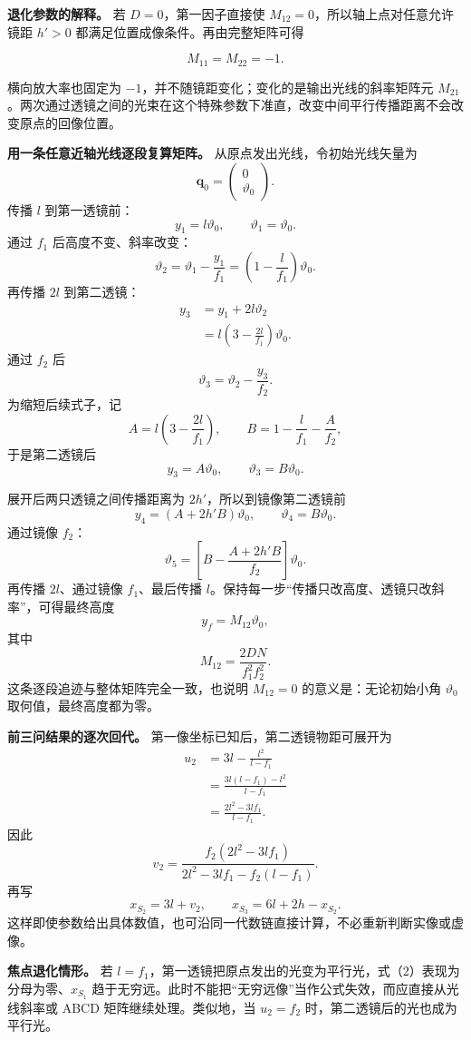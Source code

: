 \documentclass[12pt,a4paper,UTF8]{ctexart}
\begin{document}
\textbf{退化参数的解释。} 若 \(D=0\)，第一因子直接使
\(M_{12}=0\)，所以轴上点对任意允许镜距 \(h'>0\)
都满足位置成像条件。再由完整矩阵可得

\[M_{11}=M_{22}=-1.\]

横向放大率也固定为 \(-1\)，并不随镜距变化；变化的是输出光线的斜率矩阵元
\(M_{21}\)。两次通过透镜之间的光束在这个特殊参数下准直，改变中间平行传播距离不会改变原点的回像位置。

\textbf{用一条任意近轴光线逐段复算矩阵。}
从原点发出光线，令初始光线矢量为 \[
\boldsymbol q_0=
\begin{pmatrix}0\\ \vartheta_0\end{pmatrix}.
\] 传播 \(l\) 到第一透镜前： \[
y_1=l\vartheta_0,
\qquad
\vartheta_1=\vartheta_0.
\] 通过 \(f_1\) 后高度不变、斜率改变： \[
\vartheta_2
=\vartheta_1-\frac{y_1}{f_1}
=\left(1-\frac l{f_1}\right)\vartheta_0.
\] 再传播 \(2l\) 到第二透镜： \[
\begin{aligned}
y_3
&=y_1+2l\vartheta_2\\
&=l\left(3-\frac{2l}{f_1}\right)\vartheta_0.
\end{aligned}
\] 通过 \(f_2\) 后 \[
\vartheta_3
=\vartheta_2-\frac{y_3}{f_2}.
\] 为缩短后续式子，记 \[
A=l\left(3-\frac{2l}{f_1}\right),
\qquad
B=1-\frac l{f_1}-\frac A{f_2},
\] 于是第二透镜后 \[
y_3=A\vartheta_0,
\qquad
\vartheta_3=B\vartheta_0.
\]

展开后两只透镜之间传播距离为 \(2h'\)，所以到镜像第二透镜前 \[
y_4=(A+2h'B)\vartheta_0,
\qquad
\vartheta_4=B\vartheta_0.
\] 通过镜像 \(f_2\)： \[
\vartheta_5
=\left[
B-\frac{A+2h'B}{f_2}
\right]\vartheta_0.
\] 再传播 \(2l\)、通过镜像 \(f_1\)、最后传播
\(l\)。保持每一步``传播只改高度、透镜只改斜率''，可得最终高度 \[
y_f=M_{12}\vartheta_0,
\] 其中 \[
M_{12}
=\frac{2DN}{f_1^2f_2^2}.
\] 这条逐段追迹与整体矩阵完全一致，也说明 \(M_{12}=0\)
的意义是：无论初始小角 \(\vartheta_0\) 取何值，最终高度都为零。

\textbf{前三问结果的逐次回代。} 第一像坐标已知后，第二透镜物距可展开为
\[
\begin{aligned}
u_2
&=3l-\frac{l^2}{l-f_1}\\
&=\frac{3l(l-f_1)-l^2}{l-f_1}\\
&=\frac{2l^2-3lf_1}{l-f_1}.
\end{aligned}
\] 因此 \[
v_2
=\frac{f_2(2l^2-3lf_1)}
{2l^2-3lf_1-f_2(l-f_1)}.
\] 再写 \[
x_{S_2}=3l+v_2,
\qquad
x_{S_3}=6l+2h-x_{S_2}.
\]
这样即使参数给出具体数值，也可沿同一代数链直接计算，不必重新判断实像或虚像。

\textbf{焦点退化情形。} 若
\(l=f_1\)，第一透镜把原点发出的光变为平行光，式（2）表现为分母为零、\(x_{S_1}\)
趋于无穷远。此时不能把``无穷远像''当作公式失效，而应直接从光线斜率或
ABCD 矩阵继续处理。类似地，当 \(u_2=f_2\)
时，第二透镜后的光也成为平行光。
\end{document}
